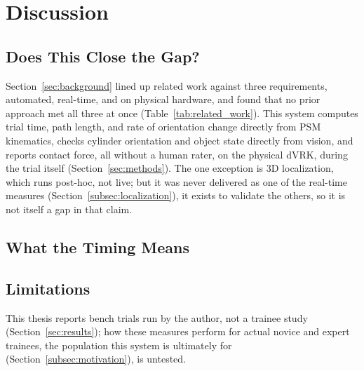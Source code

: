 ﻿\section{Discussion}
\label{sec:discussion}

\subsection{Does This Close the Gap?}

Section~\ref{sec:background} lined up related work against three
requirements, automated, real-time, and on physical hardware, and
found that no prior approach met all three at once
(Table~\ref{tab:related_work}). This system computes trial time, path
length, and rate of orientation change directly from PSM kinematics,
checks cylinder orientation and object state directly from vision,
and reports contact force, all without a human rater, on the physical
dVRK, during the trial itself (Section~\ref{sec:methods}). The one
exception is 3D localization, which runs post-hoc, not live; but it
was never delivered as one of the real-time measures
(Section~\ref{subsec:localization}), it exists to validate the
others, so it is not itself a gap in that claim.

\subsection{What the Timing Means}
\label{subsec:discussion_timing}


\subsection{Limitations}

This thesis reports bench trials run by the author, not a trainee
study (Section~\ref{sec:results}); how these measures perform for
actual novice and expert trainees, the population this system is
ultimately for (Section~\ref{subsec:motivation}), is untested.

